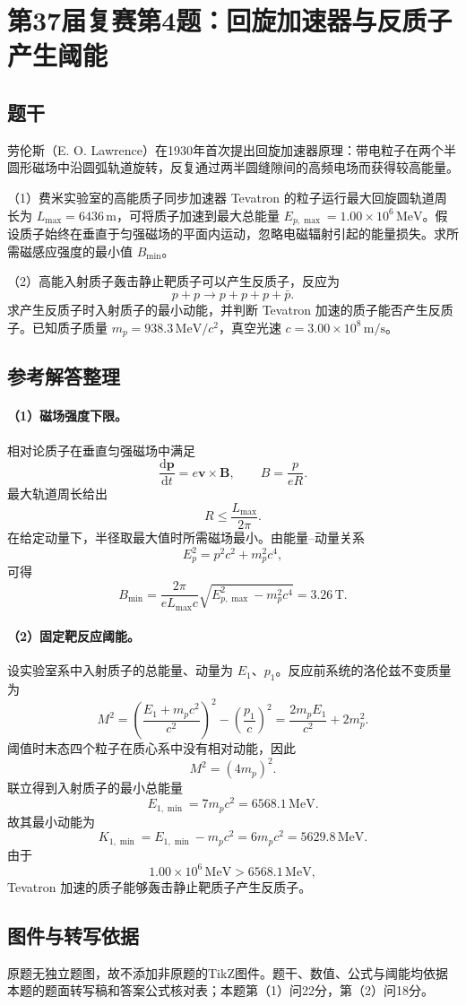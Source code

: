 \section{第37届复赛第4题：回旋加速器与反质子产生阈能}

\subsection{题干}
劳伦斯（E. O. Lawrence）在1930年首次提出回旋加速器原理：带电粒子在两个半圆形磁场中沿圆弧轨道旋转，反复通过两半圆缝隙间的高频电场而获得较高能量。

（1）费米实验室的高能质子同步加速器 Tevatron 的粒子运行最大回旋圆轨道周长为 $L_{\max}=6436\,\mathrm m$，可将质子加速到最大总能量 $E_{p,\max}=1.00\times10^6\,\mathrm{MeV}$。假设质子始终在垂直于匀强磁场的平面内运动，忽略电磁辐射引起的能量损失。求所需磁感应强度的最小值 $B_{\min}$。

（2）高能入射质子轰击静止靶质子可以产生反质子，反应为
\[
p+p\longrightarrow p+p+p+\bar p.
\]
求产生反质子时入射质子的最小动能，并判断 Tevatron 加速的质子能否产生反质子。已知质子质量 $m_p=938.3\,\mathrm{MeV}/c^2$，真空光速 $c=3.00\times10^8\,\mathrm{m/s}$。

\subsection{参考解答整理}
\paragraph{（1）磁场强度下限。}
相对论质子在垂直匀强磁场中满足
\[
\frac{\mathrm d\boldsymbol p}{\mathrm dt}=e\boldsymbol v\times\boldsymbol B,
\qquad
B=\frac{p}{eR}.
\]
最大轨道周长给出
\[
R\leqslant\frac{L_{\max}}{2\pi}.
\]
在给定动量下，半径取最大值时所需磁场最小。由能量--动量关系
\[
E_p^2=p^2c^2+m_p^2c^4,
\]
可得
\[
\boxed{B_{\min}=\frac{2\pi}{eL_{\max}c}
\sqrt{E_{p,\max}^2-m_p^2c^4}=3.26\,\mathrm T.}
\]

\paragraph{（2）固定靶反应阈能。}
设实验室系中入射质子的总能量、动量为 $E_1$、$p_1$。反应前系统的洛伦兹不变质量为
\[
M^2=\left(\frac{E_1+m_pc^2}{c^2}\right)^2-\left(\frac{p_1}{c}\right)^2
=\frac{2m_pE_1}{c^2}+2m_p^2.
\]
阈值时末态四个粒子在质心系中没有相对动能，因此
\[
M^2=(4m_p)^2.
\]
联立得到入射质子的最小总能量
\[
E_{1,\min}=7m_pc^2=6568.1\,\mathrm{MeV}.
\]
故其最小动能为
\[
\boxed{K_{1,\min}=E_{1,\min}-m_pc^2
=6m_pc^2=5629.8\,\mathrm{MeV}.}
\]
由于
\[
1.00\times10^6\,\mathrm{MeV}>6568.1\,\mathrm{MeV},
\]
Tevatron 加速的质子能够轰击静止靶质子产生反质子。

\subsection{图件与转写依据}
原题无独立题图，故不添加非原题的TikZ图件。题干、数值、公式与阈能均依据本题的题面转写稿和答案公式核对表；本题第（1）问22分，第（2）问18分。
